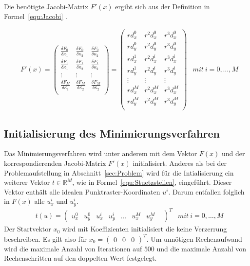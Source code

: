 Die benötigte Jacobi-Matrix $F'(x)$ ergibt sich aus der Definition in Formel~\ref{equ:Jacobi} .

\begin{equation}
\label{equ:Jacobi}
\begin{aligned}
&F'(x)=
\begin{pmatrix}
\frac{\delta F_0}{\delta \kappa_1} & \frac{\delta F_0}{\delta \kappa_2} & \frac{\delta F_0}{\delta \kappa_2}\\
\frac{\delta F_1}{\delta \kappa_1} & \frac{\delta F_1}{\delta \kappa_2} & \frac{\delta F_1}{\delta \kappa_2}\\
 \vdots & \vdots & \vdots \\
\frac{\delta F_M}{\delta \kappa_1} & \frac{\delta F_M}{\delta \kappa_2} & \frac{\delta F_M}{\delta \kappa_2}\\
\end{pmatrix}= \begin{pmatrix}
rd_x^0 & r^2d_x^0 & r^3d_x^0\\
rd_y^0 & r^2d_y^0 & r^3d_y^0\\
rd_x^1 & r^2d_x^i & r^3d_x^i\\
rd_y^1 & r^2d_y^i & r^3d_y^i\\
\vdots & \vdots & \vdots \\
rd_x^M & r^2d_x^M & r^3d_x^M\\
rd_y^M & r^2d_y^M & r^3d_y^M\\
\end{pmatrix}
&mit\ i = 0,\dots,M
\end{aligned}
\end{equation}

\subsection{Initialisierung des Minimierungsverfahren}
\label{sec:Minimierung}
Das Minimierungsverfahren wird unter anderem mit dem Vektor $F(x)$ und der korrespondierenden Jacobi-Matrix $F'(x)$ initialisiert. Anderes als bei der Problemaufstellung in Abschnitt~\ref{sec:Problem} wird für die Intialisierung ein weiterer Vektor $t \in \mathbb{R}^M$, wie in Formel~\ref{equ:Stuetzstellen}, eingeführt. Dieser Vektor enthält alle idealen Punktraster-Koordinaten $u^i$. Darum entfallen folglich in $F(x)$ alle $u_x^i$ und $u_y^i$.
\begin{equation}
\label{equ:Stuetzstellen}
\begin{aligned}
&t(u)=
\begin{pmatrix}
u_x^0&
u_y^0&
u_x^i&
u_y^i&
\dots&
u_x^M&
u_y^M&
\end{pmatrix}^T
&mit\ i = 0,\dots,M
\end{aligned}
\end{equation}
Der Startvektor $x_0$ wird mit Koeffizienten initialisiert die keine Verzerrung beschreiben. Es gilt also für $x_0 = \begin{pmatrix}
0 & 0 & 0
\end{pmatrix}^T$. Um unnötigen Rechenaufwand wird die maximale Anzahl von Iterationen auf $500$ und die maximale Anzahl von Rechenschritten auf den doppelten Wert festgelegt.

